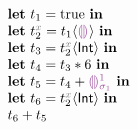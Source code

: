 


  \[\begin{array}{l}
    \ELet{t_1}{\ETrue} \EIn \\
    \ELet{\EVarNamed{2}{x}}{\ECast{t_1}{\THole}} \EIn \\
    \ELet{t_3}{\ECast{\EVarNamed{2}{x}}{\TInt}} \EIn \\
    \ELet{t_4}{\ETimes{t_3}{6}} \EIn \\
    \ELet{t_5}{\EPlus{t_4}{\EEHole{1}}} \EIn \\
    \ELet{t_6}{\ECast{\EVarNamed{2}{x}}{\TInt}} \EIn \\
    {\EPlus{t_6}{t_5}}
  \end{array}\]

